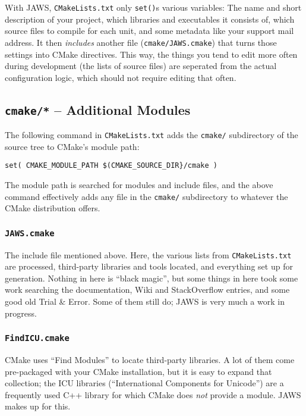 With JAWS, \lstinline{CMakeLists.txt} only \lstinline{set()}s various variables: The name and short description of your project, which libraries and executables it consists of, which source files to compile for each unit, and some metadata like your support mail address. It then \emph{includes} another file (\lstinline{cmake/JAWS.cmake}) that turns those settings into CMake directives. This way, the things you tend to edit more often during development (the lists of source files) are seperated from the actual configuration logic, which should not require editing that often.

\subsection{\texttt{cmake/*} -- Additional Modules}

The following command in \lstinline{CMakeLists.txt} adds the \lstinline{cmake/} subdirectory of the source tree to CMake's module path:

\begin{lstlisting}
set( CMAKE_MODULE_PATH $(CMAKE_SOURCE_DIR}/cmake )
\end{lstlisting}

The module path is searched for modules and include files, and the above command effectively adds any file in the \lstinline{cmake/} subdirectory to whatever the CMake distribution offers.

\subsubsection{\texttt{JAWS.cmake}}

The include file mentioned above. Here, the various lists from \lstinline{CMakeLists.txt} are processed, third-party libraries and tools located, and everything set up for generation. Nothing in here is ``black magic'', but some things in here took some work searching the documentation, Wiki and StackOverflow entries, and some good old Trial \& Error. Some of them still do; JAWS is very much a work in progress.

\subsubsection{\texttt{FindICU.cmake}}

CMake uses ``Find Modules'' to locate third-party libraries. A lot of them come pre-packaged with your CMake installation, but it is easy to expand that collection; the ICU libraries (``International Components for Unicode'') are a frequently used C++ library for which CMake does \emph{not} provide a module. JAWS makes up for this.

